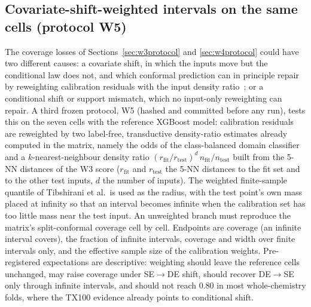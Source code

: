 \documentclass[11pt,a4paper]{article}
\newcommand{\tox}{TX100}
\begin{document}
\subsection{Covariate-shift-weighted intervals on the same cells (protocol W5)}
\label{sec:w5protocol}
The coverage losses of Sections~\ref{sec:w3protocol} and \ref{sec:w4protocol}
could have two different causes: a covariate shift, in which the inputs move
but the conditional law does not, and which conformal prediction can in
principle repair by reweighting calibration residuals with the input density
ratio~\cite{tibshirani2019}; or a conditional shift or support mismatch,
which no input-only reweighting can repair. A third frozen protocol, W5
(hashed and committed before any run), tests this on the seven cells with the
reference XGBoost model: calibration residuals are reweighted by two
label-free, transductive density-ratio estimates already computed in the
matrix, namely the odds of the class-balanced domain classifier and a
$k$-nearest-neighbour density ratio $(r_{\mathrm{fit}}/r_{\mathrm{test}})^{d}\,n_{\mathrm{fit}}/n_{\mathrm{test}}$
built from the 5-NN distances of the W3 score ($r_{\mathrm{fit}}$ and $r_{\mathrm{test}}$ the 5-NN distances to
the fit set and to the other test inputs, $d$ the number of inputs). The weighted finite-sample quantile of
Tibshirani et al.\ is used as the radius, with the test point's own mass
placed at infinity so that an interval becomes infinite when the calibration
set has too little mass near the test input. An unweighted branch must
reproduce the matrix's split-conformal coverage cell by cell. Endpoints are
coverage (an infinite interval covers), the fraction of infinite intervals,
coverage and width over finite intervals only, and the effective sample size
of the calibration weights. Pre-registered expectations are descriptive:
weighting should leave the reference cells unchanged, may raise coverage
under SE$\to$DE shift, should recover DE$\to$SE only through infinite
intervals, and should not reach 0.80 in most whole-chemistry folds, where the
\tox{} evidence already points to conditional shift.
\end{document}
